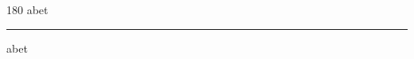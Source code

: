 
\begin{frame}
\begin{center}
\begin{turn}{180}
{\fontsize{2.5cm}{1em}\selectfont abet}
\end{turn}
\vspace{1em}\par  
\hrule
\vspace{1em}\par  
{\fontsize{2.5cm}{1em}\selectfont abet}
\end{center}
\end{frame}
